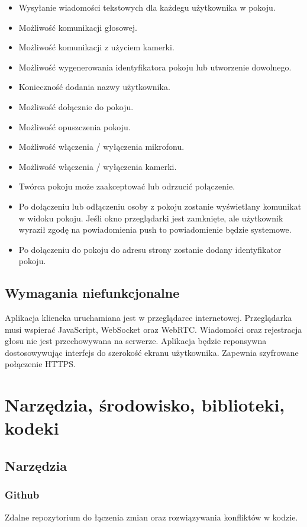 \documentclass{article}
\begin{document}
\begin{itemize}
  \item Wysyłanie wiadomości tekstowych dla każdegu użytkownika w pokoju.
  \item Możliwość komunikacji głosowej.
  \item Możliwość komunikacji z użyciem kamerki.
  \item Możliwość wygenerowania identyfikatora pokoju lub utworzenie dowolnego.
  \item Konieczność dodania nazwy użytkownika.
  \item Możliwość dołącznie do pokoju.
  \item Możliwość opuszczenia pokoju.
  \item Możliwość włączenia / wyłączenia mikrofonu.
  \item Możliwość włączenia / wyłączenia kamerki.
  \item Twórca pokoju może zaakceptować lub odrzucić połączenie.
  \item Po dołączeniu lub odłączeniu osoby z pokoju zostanie wyświetlany komunikat w widoku pokoju. Jeśli okno przeglądarki jest zamknięte, ale użytkownik wyraził zgodę na powiadomienia push to powiadomienie będzie systemowe.
  \item Po dołączeniu do pokoju do adresu strony zostanie dodany identyfikator pokoju.
\end{itemize}

\subsection{Wymagania niefunkcjonalne}
 Aplikacja kliencka uruchamiana jest w przeglądarce internetowej. Przeglądarka musi wspierać JavaScript, WebSocket oraz WebRTC. Wiadomości oraz rejestracja głosu nie jest przechowywana na serwerze. Aplikacja będzie reponsywna dostosowywując interfejs do szerokość ekranu użytkownika. Zapewnia szyfrowane połączenie HTTPS.

\section{Narzędzia, środowisko, biblioteki, kodeki}
\subsection{Narzędzia}

\subsubsection{Github}
Zdalne repozytorium do łączenia zmian oraz rozwiązywania konfliktów w kodzie.
\end{document}

